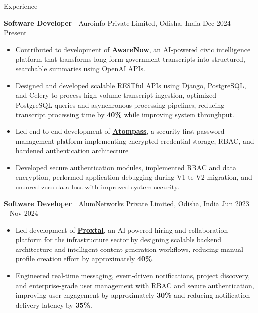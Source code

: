 \documentclass{resume}
\begin{document}
\vspace{-0.1em}
\begin{rSection}{Experience}

\textbf{Software Developer} | Auroinfo Private Limited, Odisha, India \hfill Dec 2024 -- Present
\begin{itemize}

\item Contributed to development of \textbf{\href{https://www.awarenow.ai/}{AwareNow}}, an AI-powered civic intelligence platform that transforms long-form government transcripts into structured, searchable summaries using OpenAI APIs.
\item Designed and developed scalable RESTful APIs using Django, PostgreSQL, and Celery to process high-volume transcript ingestion, optimized PostgreSQL queries and asynchronous processing pipelines, reducing transcript processing time by \textbf{40\%} while improving system throughput.
\item Led end-to-end development of \textbf{\href{https://atompass.com/}{Atompass}}, a security-first password management platform implementing encrypted credential storage, RBAC, and hardened authentication architecture.

\item Developed secure authentication modules, implemented RBAC and data encryption, performed application debugging during V1 to V2 migration, and ensured zero data loss with improved system security.
\end{itemize}


\textbf{Software Developer} | AlumNetworks Private Limited, Odisha, India \hfill Jun 2023 -- Nov 2024
\begin{itemize}
\item Led development of \textbf{\href{https://proxtal.com}{Proxtal}}, an AI-powered hiring and collaboration platform for the infrastructure sector by designing scalable backend architecture and intelligent content generation workflows, reducing manual profile creation effort by approximately \textbf{40\%}.

\item Engineered real-time messaging, event-driven notifications, project discovery, and enterprise-grade user management with RBAC and secure authentication, improving user engagement by approximately \textbf{30\%} and reducing notification delivery latency by \textbf{35\%}.


\end{itemize}
\end{rSection}
\end{document}
